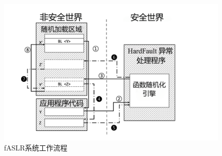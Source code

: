 \documentclass[UTF8,12pt,a4paper]{ctexart}
\numberwithin{figure}{section}
\begin{document}
\begin{figure}[H]
    \centering
    \includegraphics[scale=0.4]{graph/workflow.png}
    \caption{fASLR系统工作流程}
    \label{fig:workflow}
\end{figure}
\end{document}
